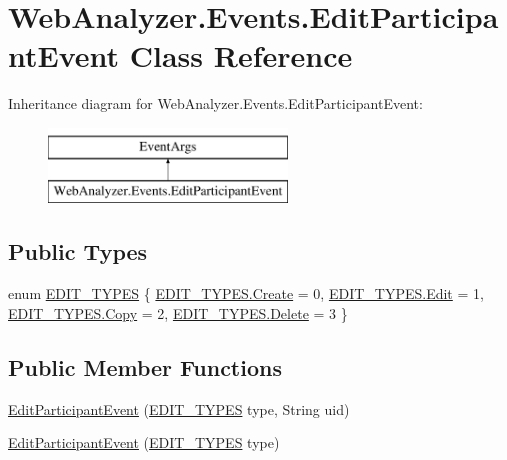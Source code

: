 \hypertarget{class_web_analyzer_1_1_events_1_1_edit_participant_event}{}\section{Web\+Analyzer.\+Events.\+Edit\+Participant\+Event Class Reference}
\label{class_web_analyzer_1_1_events_1_1_edit_participant_event}
Inheritance diagram for Web\+Analyzer.\+Events.\+Edit\+Participant\+Event\+:\begin{figure}[H]
\begin{center}
\leavevmode
\includegraphics[height=2.000000cm]{class_web_analyzer_1_1_events_1_1_edit_participant_event}
\end{center}
\end{figure}
\subsection*{Public Types}
\begin{DoxyCompactItemize}
\item 
enum \hyperlink{class_web_analyzer_1_1_events_1_1_edit_participant_event_a72647511d8ac40197121e93d14913a1a}{E\+D\+I\+T\+\_\+\+T\+Y\+P\+E\+S} \{ \hyperlink{class_web_analyzer_1_1_events_1_1_edit_participant_event_a72647511d8ac40197121e93d14913a1aa686e697538050e4664636337cc3b834f}{E\+D\+I\+T\+\_\+\+T\+Y\+P\+E\+S.\+Create} = 0, 
\hyperlink{class_web_analyzer_1_1_events_1_1_edit_participant_event_a72647511d8ac40197121e93d14913a1aa7dce122004969d56ae2e0245cb754d35}{E\+D\+I\+T\+\_\+\+T\+Y\+P\+E\+S.\+Edit} = 1, 
\hyperlink{class_web_analyzer_1_1_events_1_1_edit_participant_event_a72647511d8ac40197121e93d14913a1aa5fb63579fc981698f97d55bfecb213ea}{E\+D\+I\+T\+\_\+\+T\+Y\+P\+E\+S.\+Copy} = 2, 
\hyperlink{class_web_analyzer_1_1_events_1_1_edit_participant_event_a72647511d8ac40197121e93d14913a1aaf2a6c498fb90ee345d997f888fce3b18}{E\+D\+I\+T\+\_\+\+T\+Y\+P\+E\+S.\+Delete} = 3
 \}
\end{DoxyCompactItemize}
\subsection*{Public Member Functions}
\begin{DoxyCompactItemize}
\item 
\hyperlink{class_web_analyzer_1_1_events_1_1_edit_participant_event_a060c5e39919bd1efe735bd5fc9f7186a}{Edit\+Participant\+Event} (\hyperlink{class_web_analyzer_1_1_events_1_1_edit_participant_event_a72647511d8ac40197121e93d14913a1a}{E\+D\+I\+T\+\_\+\+T\+Y\+P\+E\+S} type, String uid)
\item 
\hyperlink{class_web_analyzer_1_1_events_1_1_edit_participant_event_a5567b80550abf0c9036094cd8f9c68dd}{Edit\+Participant\+Event} (\hyperlink{class_web_analyzer_1_1_events_1_1_edit_participant_event_a72647511d8ac40197121e93d14913a1a}{E\+D\+I\+T\+\_\+\+T\+Y\+P\+E\+S} type)
\end{DoxyCompactItemize}
